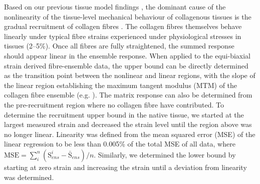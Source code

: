     Based on our previous tissue model findings \cite{sacks_incorporation_2003}\cite{fata_insights_2014}\cite{fan_simulation_2014}\cite{lee_presence_2015}, the dominant cause of the nonlinearity of the tissue-level mechanical behaviour of collagenous tissues is the gradual recruitment of collagen fibres \cite{lanir_constitutive_1983}. The collagen fibres themselves behave linearly under typical fibre strains experienced under physiological stresses in tissues (2–5\%). 
    Once all fibres are fully straightened, the summed response should appear linear in the ensemble response. When applied to the equi-biaxial strain derived fibre-ensemble data, the upper bound can be directly determined as the transition point between the nonlinear and linear regions, with the slope of the linear region establishing the maximum tangent modulus (MTM) of the collagen fibre ensemble (e.g. \cite{fata_insights_2014}). The matrix response can also be determined from the pre-recruitment region where no collagen fibre have contributed. To determine the recruitment upper bound in the native tissue, we started at the largest measured strain and decreased the strain level until the region above was no longer linear. Linearity was defined from the mean squared error (MSE) of the linear regression to be less than 0.005\% of the total MSE of all data, where $\mathrm{MSE} = \sum_i^n (\mathrm{S}^i_{ens} - \bar{\mathrm{S}}_{ens})/n$. Similarly, we determined the lower bound by starting at zero strain and increasing the strain until a deviation from linearity was determined.
    
